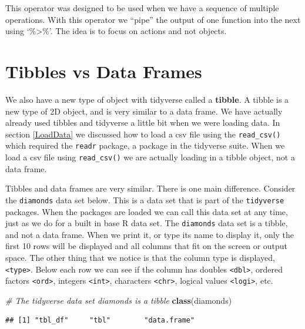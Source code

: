 \documentclass[
]{book}
\newenvironment{Shaded}{\begin{snugshade}}{\end{snugshade}}
\newcommand{\CommentTok}[1]{\textcolor[rgb]{0.56,0.35,0.01}{\textit{#1}}}
\newcommand{\KeywordTok}[1]{\textcolor[rgb]{0.13,0.29,0.53}{\textbf{#1}}}
\newcommand{\NormalTok}[1]{#1}
\begin{document}
This operator was designed to be used when we have a sequence of multiple operations. With this operator we ``pipe'' the output of one function into the next using `\%\textgreater\%'. The idea is to focus on actions and not objects.

\hypertarget{tibbles-vs-data-frames}{%
\section{Tibbles vs Data Frames}\label{tibbles-vs-data-frames}}

We also have a new type of object with tidyverse called a \textbf{tibble}. A tibble is a new type of 2D object, and is very similar to a data frame. We have actually already used tibbles and tidyverse a little bit when we were loading data. In section \ref{LoadData} we discussed how to load a csv file using the \texttt{read\_csv()} which required the \texttt{readr} package, a package in the tidyverse suite. When we load a csv file using \texttt{read\_csv()} we are actually loading in a tibble object, not a data frame.

Tibbles and data frames are very similar. There is one main difference. Consider the \texttt{diamonds} data set below. This is a data set that is part of the \texttt{tidyverse} packages. When the packages are loaded we can call this data set at any time, just as we do for a built in base R data set. The \texttt{diamonds} data set is a tibble, and not a data frame. When we print it, or type its name to display it, only the first 10 rows will be displayed and all columns that fit on the screen or output space. The other thing that we notice is that the column type is displayed, \texttt{\textless{}type\textgreater{}}. Below each row we can see if the column has doubles \texttt{\textless{}dbl\textgreater{}}, ordered factors \texttt{\textless{}ord\textgreater{}}, integers \texttt{\textless{}int\textgreater{}}, characters \texttt{\textless{}chr\textgreater{}}, logical values \texttt{\textless{}logi\textgreater{}}, etc.

\begin{Shaded}
\begin{Highlighting}[]
\CommentTok{# The tidyverse data set diamonds is a tibble}
\KeywordTok{class}\NormalTok{(diamonds)}
\end{Highlighting}
\end{Shaded}

\begin{verbatim}
## [1] "tbl_df"     "tbl"        "data.frame"
\end{verbatim}
\end{document}

